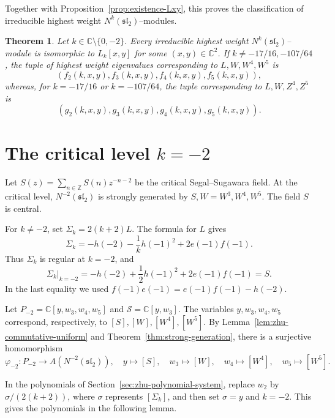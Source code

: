 \documentclass[11 pt]{amsart}
\newtheorem{theorem}{Theorem}
\theoremstyle{definition}
\theoremstyle{plain}
\begin{document}
Together with Proposition~\ref{prop:existence-Lxy}, this proves the
classification of irreducible highest weight
$N^k(\mathfrak{sl}_2)$--modules.

\begin{theorem}\label{class-univ}
Let $k\in\mathbb C\setminus\{0,-2\}$. Every irreducible highest weight
$N^k(\mathfrak{sl}_2)$--module is isomorphic to $L_k[x,y]$ for some
$(x,y)\in\mathbb C^2$. If
$k\neq-17/16,-107/64$, the tuple of highest weight eigenvalues
corresponding to $L,W,W^4,W^5$ is
\[
  (f_2(k,x,y),f_3(k,x,y),f_4(k,x,y),f_5(k,x,y)),
\]
whereas, for $k=-17/16$ or $k=-107/64$, the tuple corresponding to
$L,W,Z^4,Z^5$ is
\[
  (g_2(k,x,y),g_3(k,x,y),g_4(k,x,y),g_5(k,x,y)).
\]
\end{theorem}



\section{The critical level $k=-2$}
\label{sec:critical-level}

Let $S(z)=\sum_{n\in\mathbb Z}S(n)z^{-n-2}$
be the critical Segal--Sugawara field. At the critical level,
$N^{-2}(\mathfrak{sl}_2)$ is strongly generated by
$S,W=W^3,W^4,W^5$.
The field $S$ is central.

For $k\neq-2$, set $\Sigma_k=2(k+2)L$. The formula for $L$ gives
\[
\Sigma_k=-h(-2)-\frac1k h(-1)^2+2e(-1)f(-1).
\]
Thus $\Sigma_k$ is regular at $k=-2$, and
\[
\left.\Sigma_k\right|_{k=-2}
=-h(-2)+\frac12h(-1)^2+2e(-1)f(-1)=S.
\]
In the last equality we used
$f(-1)e(-1)=e(-1)f(-1)-h(-2)$.

Let $P_{-2}=\mathbb C[y,w_3,w_4,w_5]$ and
$\mathcal S=\mathbb C[y,w_3]$.
The variables $y,w_3,w_4,w_5$ correspond, respectively, to
$[S],[W],[W^4],[W^5]$. By
Lemma~\ref{lem:zhu-commutative-uniform} and
Theorem~\ref{thm:strong-generation}, there is a surjective homomorphism
\[
\varphi_{-2}:P_{-2}\longrightarrow
A(N^{-2}(\mathfrak{sl}_2)),
\quad
y\mapsto[S],\quad w_3\mapsto[W],\quad
w_4\mapsto[W^4],\quad w_5\mapsto[W^5].
\]

In the polynomials of Section~\ref{sec:zhu-polynomial-system}, replace
$w_2$ by $\sigma/(2(k+2))$, where $\sigma$ represents
$[\Sigma_k]$, and then set $\sigma=y$ and $k=-2$. This gives the
polynomials in the following lemma.
\end{document}
